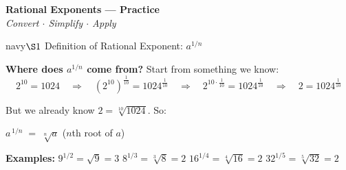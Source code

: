 \documentclass[12pt]{article}
\begin{document}
\begin{tcolorbox}[enhanced, arc=7pt,
  colback=navy, colframe=gold, boxrule=2.8pt,
  left=14pt, right=14pt, top=11pt, bottom=11pt]
  \begin{center}
    {\color{gold}\fontsize{22}{26}\selectfont\bfseries
      Rational Exponents --- Practice}\\[5pt]
    {\color{white}\large\itshape
      Convert $\cdot$ Simplify $\cdot$ Apply}
  \end{center}
\end{tcolorbox}

\vspace{10pt}


\begin{ideabox}{navy}{$\S1$ \quad Definition of Rational Exponent: $a^{1/n}$}

\textbf{Where does $a^{1/n}$ come from?} Start from something we know:
\[
2^{10} = 1024
\quad\Rightarrow\quad
(2^{10})^{\frac{1}{10}} = 1024^{\frac{1}{10}}
\quad\Rightarrow\quad
2^{10 \cdot \frac{1}{10}} = 1024^{\frac{1}{10}}
\quad\Rightarrow\quad
2 = 1024^{\frac{1}{10}}
\]

But we already know $2 = \sqrt[10]{1024}$. \; So:

\begin{center}
\begin{tcolorbox}[colback=skyblue, colframe=navy, arc=4pt, boxrule=1pt,
  left=6pt, right=6pt, top=5pt, bottom=5pt, width=0.7\linewidth]
\centering
\Large $a^{\,1/n} \;=\; \sqrt[n]{a}$
\hspace{20pt}
\normalsize ($n$th root of $a$)
\end{tcolorbox}
\end{center}

\textbf{Examples:}\quad
$9^{1/2}=\sqrt{9}=3$\hspace{1em}
$8^{1/3}=\sqrt[3]{8}=2$\hspace{1em}
$16^{1/4}=\sqrt[4]{16}=2$\hspace{1em}
$32^{1/5}=\sqrt[5]{32}=2$

\end{ideabox}

\vspace{8pt}
\end{document}
